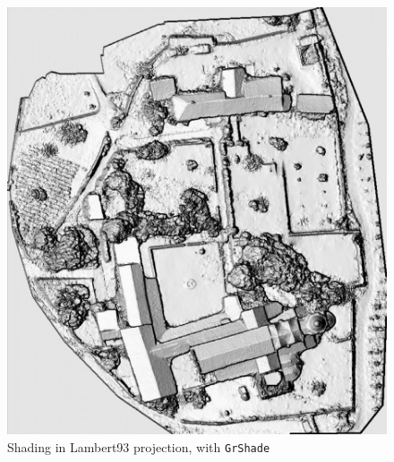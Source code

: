 \begin{figure}
\begin{center}
\includegraphics[width=160mm]{FIGS/Cuxa/L93-Shade.jpg}
\caption{Shading in Lambert93 projection, with {\tt GrShade}}
\end{center}
\end{figure}


